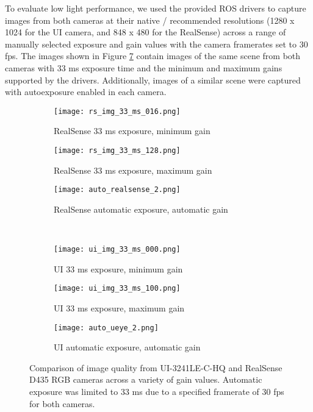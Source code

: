 \begin{description}
	To evaluate low light performance, we used the provided ROS drivers to capture images from both cameras at their native / recommended resolutions (1280 x 1024 for the UI camera, and 848 x 480 for the RealSense) across a range of manually selected exposure and gain values with the camera framerates set to 30 fps. The images shown in Figure \ref{camera_comparison} contain images of the same scene from both cameras with 33 ms exposure time and the minimum and maximum gains supported by the drivers. Additionally, images of a similar scene were captured with autoexposure enabled in each camera.
	
	\begin{figure}
		\centering
		\begin{subfigure}{0.3\textwidth}
			\texttt{[image: rs\_img\_33\_ms\_016.png]}
			\caption{RealSense 33 ms exposure, minimum gain}
			\label{rs_img_33_ms_016}
		\end{subfigure}		
		\hfill
		\begin{subfigure}{0.3\textwidth}
			\texttt{[image: rs\_img\_33\_ms\_128.png]}
			\caption{RealSense 33 ms exposure, maximum gain}
			\label{rs_img_33_ms_128}		
		\end{subfigure}
		\hfill
		\begin{subfigure}{0.3\textwidth}
			\texttt{[image: auto\_realsense\_2.png]}
			\caption{RealSense automatic exposure, automatic gain}
			\label{auto_realsense_2}
		\end{subfigure}
		\\
		\begin{subfigure}{0.3\textwidth}
			\texttt{[image: ui\_img\_33\_ms\_000.png]}
			\caption{UI 33 ms exposure, minimum gain}
			\label{ui_img_33_ms_000}
		\end{subfigure}		
		\hfill
		\begin{subfigure}{0.3\textwidth}
			\texttt{[image: ui\_img\_33\_ms\_100.png]}
			\caption{UI 33 ms exposure, maximum gain}
			\label{ui_img_33_ms_100}		
		\end{subfigure}
		\hfill
		\begin{subfigure}{0.3\textwidth}
			\texttt{[image: auto\_ueye\_2.png]}
			\caption{UI automatic exposure, automatic gain}
			\label{auto_ueye_2}
		\end{subfigure}		
		\caption[RGB camera image quality comparison]{Comparison of image quality from UI-3241LE-C-HQ and RealSense D435 RGB cameras across a variety of gain values. Automatic exposure was limited to 33 ms due to a specified framerate of 30 fps for both cameras.}
		\label{camera_comparison}
	\end{figure}


\end{description}
